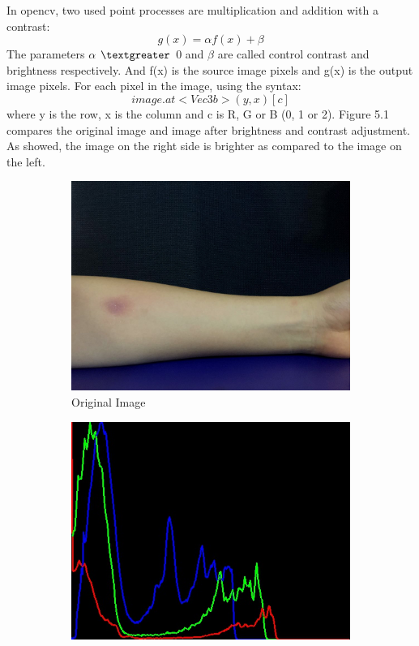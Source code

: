 In opencv, two used point processes are multiplication and addition with a contrast:
\begin{displaymath}
g(x) = \alpha f(x) + \beta 
\end{displaymath}
The parameters $\alpha$ $\textgreater$ 0 and $\beta$ are called control contrast and brightness respectively. And f(x) is the source image pixels and g(x) is the output image pixels. For each pixel in the image, using the syntax: 
\begin{displaymath}
image.at<Vec3b>(y,x)[c] 
\end{displaymath}
where y is the row, x is the column and c is R, G or B (0, 1 or 2). Figure 5.1 compares the original image and image after brightness and contrast adjustment. As showed, the image on the right side is brighter as compared to the image on the left.
\begin{figure}[!h]
\centering
\begin{subfigure}{.5\textwidth}
  \centering
  \includegraphics[scale=0.23]{img/original}
  \caption{Original Image}
  \label{fig:sub1}
\end{subfigure}%
\begin{subfigure}{.5\textwidth}
  \centering
  \includegraphics[scale=0.43]{img/image}

\end{subfigure}
\end{figure}
